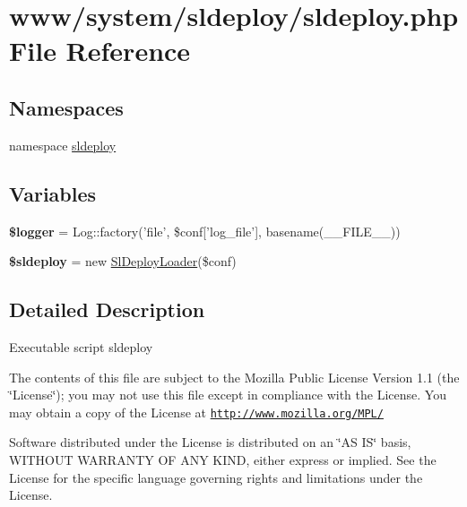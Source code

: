 \hypertarget{sldeploy_8php}{
\section{www/system/sldeploy/sldeploy.php File Reference}
\label{sldeploy_8php}
}
\subsection*{Namespaces}
\begin{DoxyCompactItemize}
\item 
namespace \hyperlink{namespacesldeploy}{sldeploy}
\end{DoxyCompactItemize}
\subsection*{Variables}
\begin{DoxyCompactItemize}
\item 
\hypertarget{sldeploy_8php_aebfec76216371ef236acc5910e90933d}{
{\bfseries \$logger} = Log::factory('file', \$conf\mbox{[}'log\_\-file'\mbox{]}, basename(\_\-\_\-FILE\_\-\_\-))}
\label{sldeploy_8php_aebfec76216371ef236acc5910e90933d}

\item 
\hypertarget{sldeploy_8php_af06d990b7bc042b7a741345a8effd63b}{
{\bfseries \$sldeploy} = new \hyperlink{class_sl_deploy_loader}{SlDeployLoader}(\$conf)}
\label{sldeploy_8php_af06d990b7bc042b7a741345a8effd63b}

\end{DoxyCompactItemize}


\subsection{Detailed Description}
Executable script sldeploy

The contents of this file are subject to the Mozilla Public License Version 1.1 (the \char`\"{}License\char`\"{}); you may not use this file except in compliance with the License. You may obtain a copy of the License at \href{http://www.mozilla.org/MPL/}{\tt http://www.mozilla.org/MPL/}

Software distributed under the License is distributed on an \char`\"{}AS IS\char`\"{} basis, WITHOUT WARRANTY OF ANY KIND, either express or implied. See the License for the specific language governing rights and limitations under the License. 